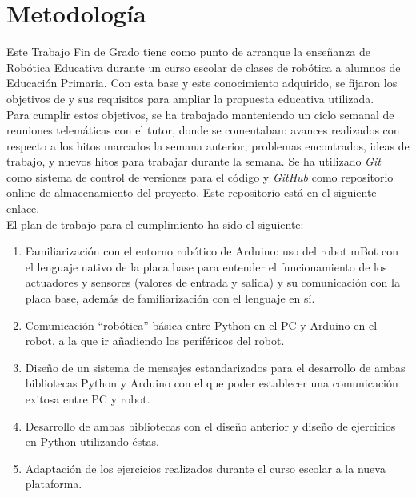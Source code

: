 \section{Metodología}\label{sec:metologia}
Este Trabajo Fin de Grado tiene como punto de arranque la enseñanza de Robótica Educativa durante un curso escolar de clases de robótica a alumnos de Educación Primaria. Con esta base y este conocimiento adquirido, se fijaron los objetivos de y sus requisitos para ampliar la propuesta educativa utilizada.\\
Para cumplir estos objetivos, se ha trabajado manteniendo un ciclo semanal de reuniones telemáticas con el tutor, donde se comentaban: avances realizados con respecto a los hitos marcados la semana anterior, problemas encontrados, ideas de trabajo, y nuevos hitos para trabajar durante la semana. Se ha utilizado \textit{Git} como sistema de control de versiones para el código y \textit{GitHub} como repositorio online de almacenamiento del proyecto. Este repositorio está en el siguiente \href{https://github.com/RoboticsLabURJC/2017-tfg-eva_garcia}{enlace}.\\
El plan de trabajo para el cumplimiento ha sido el siguiente:
\begin{enumerate}
	\item Familiarización con el entorno robótico de Arduino: uso del robot mBot con el lenguaje nativo de la placa base para entender el funcionamiento de los actuadores y sensores (valores de entrada y salida) y su comunicación con la placa base, además de familiarización con el lenguaje en sí. 
	\item Comunicación ``robótica'' básica entre Python en el PC y Arduino en el robot, a la que ir añadiendo los periféricos del robot.
	\item Diseño de un sistema de mensajes estandarizados para el desarrollo de ambas bibliotecas Python y Arduino con el que poder establecer una comunicación exitosa entre PC y robot.
	\item Desarrollo de ambas bibliotecas con el diseño anterior y diseño de ejercicios en Python utilizando éstas.
	\item Adaptación de los ejercicios realizados durante el curso escolar a la nueva plataforma.
\end{enumerate}